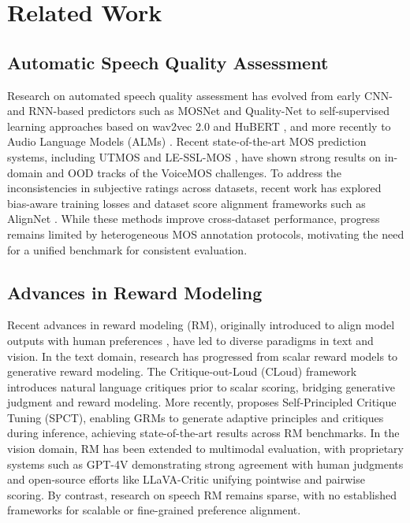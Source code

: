 \section{Related Work}

\subsection{Automatic Speech Quality Assessment}
Research on automated speech quality assessment has evolved from early CNN- and RNN-based predictors such as MOSNet and Quality-Net \citep{lo2019mosnet, fu2018quality} to self-supervised learning approaches based on wav2vec 2.0 and HuBERT \citep{baevski2020wav2vec, hsu2021hubert}, and more recently to Audio Language Models (ALMs) \citep{wang2025enabling, deshmukh2024pam, chen2025audio, zezario2025study}. Recent state-of-the-art MOS prediction systems, including UTMOS \citep{saeki2022utmos} and LE-SSL-MOS \citep{qi2023ssl}, have shown strong results on in-domain and OOD tracks of the VoiceMOS challenges. To address the inconsistencies in subjective ratings across datasets, recent work has explored bias-aware training losses \citep{mittag2021bias} and dataset score alignment frameworks such as AlignNet \citep{pieper2024alignnet}. While these methods improve cross-dataset performance, progress remains limited by heterogeneous MOS annotation protocols, motivating the need for a unified benchmark for consistent evaluation.

\subsection{Advances in Reward Modeling}
Recent advances in reward modeling (RM), originally introduced to align model outputs with human preferences \citep{ouyang2022training}, have led to diverse paradigms in text and vision. In the text domain, research has progressed from scalar reward models to generative reward modeling. The Critique-out-Loud (CLoud) framework \citep{ankner2024critique} introduces natural language critiques prior to scalar scoring, bridging generative judgment and reward modeling. More recently, \citet{liu2025inference} proposes Self-Principled Critique Tuning (SPCT), enabling GRMs to generate adaptive principles and critiques during inference, achieving state-of-the-art results across RM benchmarks. In the vision domain, RM has been extended to multimodal evaluation, with proprietary systems such as GPT-4V \citep{achiam2023gpt} demonstrating strong agreement with human judgments and open-source efforts like LLaVA-Critic \citep{xiong2025llava} unifying pointwise and pairwise scoring. By contrast, research on speech RM remains sparse, with no established frameworks for scalable or fine-grained preference alignment.